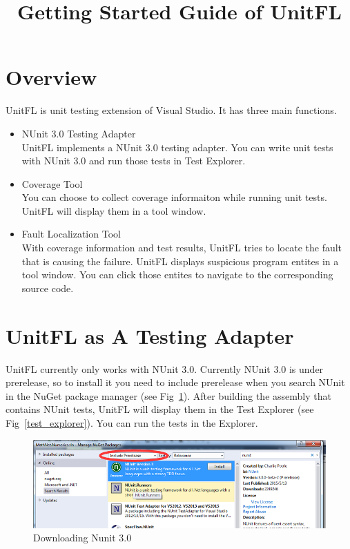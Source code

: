\documentclass[11pt]{article} %
\title{Getting Started Guide of UnitFL}
\date{} %
\begin{document}
\maketitle

\section{Overview}

UnitFL is unit testing extension of Visual Studio. It has three main functions.
\begin{itemize}
\item{NUnit 3.0 Testing Adapter} \\
UnitFL implements a NUnit 3.0 testing adapter. You can write unit tests with NUnit 3.0 and run those tests in Test Explorer.
\item{Coverage Tool} \\
You can choose to collect coverage informaiton while running unit tests. UnitFL will display them in a tool window.
\item{Fault Localization Tool} \\
With coverage information and test results, UnitFL tries to locate the fault that is causing the failure. UnitFL displays suspicious
program entites in a tool window. You can click those entites to navigate to the corresponding source code.
\end{itemize}

\section{UnitFL as A Testing Adapter}
UnitFL currently only works with NUnit 3.0. Currently NUnit 3.0 is under prerelease, so to install it you need to include prerelease when you 
search NUnit in the NuGet package manager (see Fig~\ref{download_nunit}). 
After building the assembly that contains NUnit tests, UnitFL will display them in the Test Explorer (see Fig~\ref{test_explorer}). You can 
run the tests in the Explorer.

\begin{figure}
	\centering
	\includegraphics[width=6in]{download_nunit}
	\caption{Downloading Nunit 3.0}
	\label{download_nunit}
\end{figure}
\end{document}
